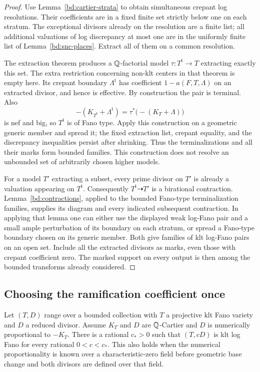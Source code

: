 \begin{proof}
Use Lemma~\ref{bd:cartier-strata} to obtain simultaneous crepant
log resolutions.  Their coefficients are in a fixed finite set
strictly below one on each stratum.  The exceptional divisors
already on the resolution are a finite list; all additional
valuations of log discrepancy at most one are in the uniformly
finite list of Lemma~\ref{bd:snc-places}.  Extract all of them on
a common resolution.

The extraction theorem \cite[Corollary~1.4.3]{BCHM10} produces a
$\mathbb Q$-factorial model $\tau:T^{\mathrm t}\to T$ extracting exactly
this set.  The extra restriction concerning non-klt centers in
that theorem is empty here.  Its crepant boundary
$\Lambda^{\mathrm t}$ has coefficient $1-a(F,T,\Lambda)$ on an
extracted divisor, and hence is effective.  By construction the
pair is terminal.  Also
\[
 -(K_{T^{\mathrm t}}+\Lambda^{\mathrm t})
             =\tau^*\bigl(-(K_T+\Lambda)\bigr)
\]
is nef and big, so $T^{\mathrm t}$ is of Fano type.  Apply this
construction on a geometric generic member and spread it; the
fixed extraction list, crepant equality, and the discrepancy
inequalities persist after shrinking.  Thus the terminalizations
and all their marks form bounded families.  This construction
does not resolve an unbounded set of arbitrarily chosen higher
models.

For a model $T'$ extracting a subset, every prime divisor on
$T'$ is already a valuation appearing on $T^{\mathrm t}$.
Consequently $T^{\mathrm t}\dashrightarrow T'$ is a birational
contraction.  Lemma~\ref{bd:contractions}, applied to the bounded
Fano-type terminalization families, supplies its diagram and
every indicated subsequent contraction.  In applying that lemma
one can either use the displayed weak log-Fano pair and a small
ample perturbation of its boundary on each stratum, or spread
a Fano-type boundary chosen on its generic member.  Both give
families of klt log-Fano pairs on an open set.  Include all the
extracted divisors as marks, even those with crepant coefficient
zero.  The marked support on every output is then among the
bounded transforms already considered.
\end{proof}

\subsection{Choosing the ramification coefficient once}

\begin{lemma}
\label{bd:coefficient}
Let $(T,D)$ range over a bounded collection with $T$ a
projective klt Fano variety and $D$ a reduced divisor.  Assume
$K_T$ and $D$ are $\mathbb Q$-Cartier and $D$ is numerically
proportional to $-K_T$.  There is a rational $c_*>0$ such
that $(T,cD)$ is klt log Fano for every rational
$0<c<c_*$.  This also holds when the numerical proportionality
is known over a characteristic-zero field before geometric
base change and both divisors are defined over that field.
\end{lemma}

